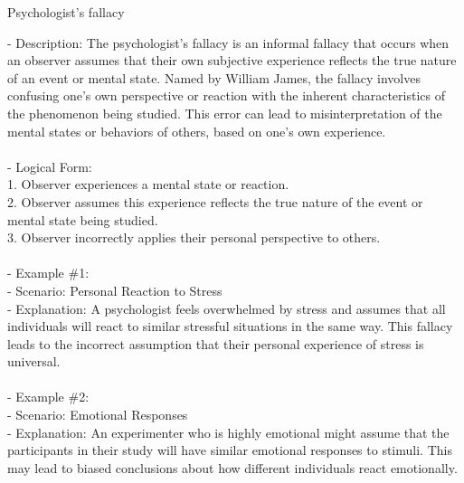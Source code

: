 \documentclass[a4paper,12pt,single,pdftex]{scrbook}
\begin{document}
Psychologist's fallacy
    
      - Description: The psychologist's fallacy is an informal fallacy that occurs when an observer assumes that their own subjective experience reflects the true nature of an event or mental state. Named by William James, the fallacy involves confusing one's own perspective or reaction with the inherent characteristics of the phenomenon being studied. This error can lead to misinterpretation of the mental states or behaviors of others, based on one's own experience.
    \\

    
      
    \\

    
      - Logical Form:
    \\

    
        1. Observer experiences a mental state or reaction.
    \\

    
        2. Observer assumes this experience reflects the true nature of the event or mental state being studied.
    \\

    
        3. Observer incorrectly applies their personal perspective to others.
    \\

    
      
    \\

    
      - Example \#1:
    \\

    
        - Scenario: Personal Reaction to Stress
    \\

    
        - Explanation: A psychologist feels overwhelmed by stress and assumes that all individuals will react to similar stressful situations in the same way. This fallacy leads to the incorrect assumption that their personal experience of stress is universal.
    \\

    
      
    \\

    
      - Example \#2:
    \\

    
        - Scenario: Emotional Responses
    \\

    
        - Explanation: An experimenter who is highly emotional might assume that the participants in their study will have similar emotional responses to stimuli. This may lead to biased conclusions about how different individuals react emotionally.
    \\
\end{document}
